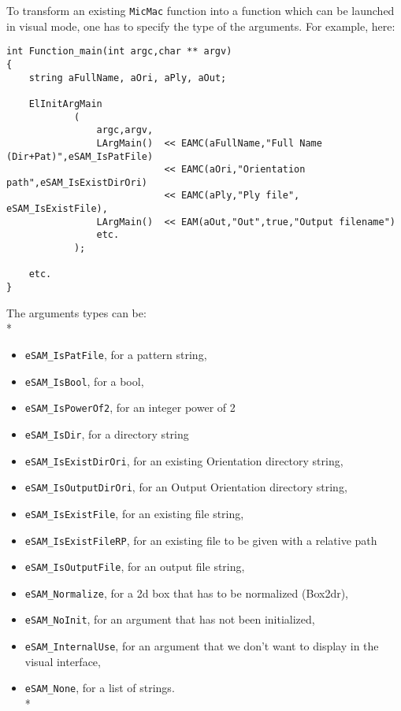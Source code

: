 To transform an existing  {\tt MicMac} function into a function which can be launched in visual mode, one has to specify the type of the arguments. For example, here:

\begin{verbatim}
int Function_main(int argc,char ** argv)
{
    string aFullName, aOri, aPly, aOut;

    ElInitArgMain
            (
                argc,argv,
                LArgMain()  << EAMC(aFullName,"Full Name (Dir+Pat)",eSAM_IsPatFile)
                            << EAMC(aOri,"Orientation path",eSAM_IsExistDirOri)
                            << EAMC(aPly,"Ply file", eSAM_IsExistFile),
                LArgMain()  << EAM(aOut,"Out",true,"Output filename")
                etc.
            );
            
    etc.
}
\end{verbatim}


The arguments types can be:\\*
\begin{itemize}
\item  {\tt eSAM\_IsPatFile}, for a pattern string,
\item  {\tt eSAM\_IsBool}, for a bool,
\item  {\tt eSAM\_IsPowerOf2}, for an integer power of 2
\item  {\tt eSAM\_IsDir}, for a directory string
\item  {\tt eSAM\_IsExistDirOri}, for an existing Orientation directory string,
\item  {\tt eSAM\_IsOutputDirOri}, for an Output Orientation directory string,
\item  {\tt eSAM\_IsExistFile}, for an existing file string,
\item  {\tt eSAM\_IsExistFileRP}, for an existing file to be given with a relative path
\item  {\tt eSAM\_IsOutputFile}, for an output file string,
\item  {\tt eSAM\_Normalize}, for a 2d box that has to be normalized (Box2dr),
\item  {\tt eSAM\_NoInit}, for an argument that has not been initialized,
\item  {\tt eSAM\_InternalUse}, for an argument that we don't want to display in the visual interface,
\item {\tt eSAM\_None}, for a list of strings.\\*
\end{itemize}

